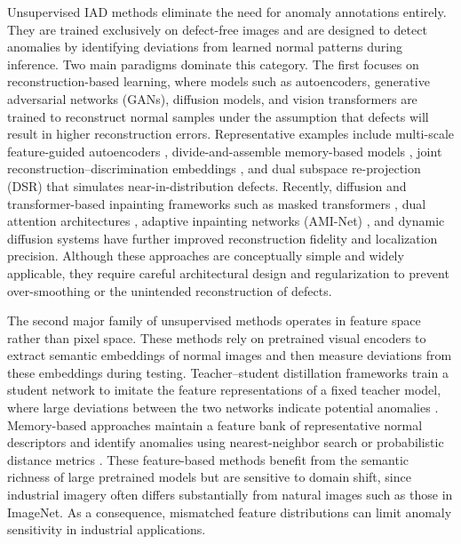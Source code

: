 Unsupervised IAD methods eliminate the need for anomaly annotations entirely. They are trained exclusively on defect-free images and are designed to detect anomalies by identifying deviations from learned normal patterns during inference. Two main paradigms dominate this category. The first focuses on reconstruction-based learning, where models such as autoencoders, generative adversarial networks (GANs), diffusion models, and vision transformers are trained to reconstruct normal samples under the assumption that defects will result in higher reconstruction errors. Representative examples include multi-scale feature-guided autoencoders \cite{shi2021dfr}, divide-and-assemble memory-based models \cite{hou2021divide}, joint reconstruction–discrimination embeddings \cite{zavrtanik2021draem}, and dual subspace re-projection (DSR) \cite{zavrtanik2022dsr} that simulates near-in-distribution defects. Recently, diffusion and transformer-based inpainting frameworks such as masked transformers \cite{de2022masked}, dual attention architectures \cite{yao2023focus}, adaptive inpainting networks (AMI-Net) \cite{luo2024ami}, and dynamic diffusion systems \cite{zhang2023unsupervised, lu2023removing, tebbe2024dynamic} have further improved reconstruction fidelity and localization precision. Although these approaches are conceptually simple and widely applicable, they require careful architectural design and regularization to prevent over-smoothing or the unintended reconstruction of defects.

The second major family of unsupervised methods operates in feature space rather than pixel space. These methods rely on pretrained visual encoders to extract semantic embeddings of normal images and then measure deviations from these embeddings during testing. Teacher–student distillation frameworks train a student network to imitate the feature representations of a fixed teacher model, where large deviations between the two networks indicate potential anomalies \cite{bergmann2020uninformed, salehi2021multiresolution, wan2022unsupervised, gu2023remembering, tong2024enhanced}. Memory-based approaches maintain a feature bank of representative normal descriptors and identify anomalies using nearest-neighbor search or probabilistic distance metrics \cite{defard2021padim, roth2022towards, bae2023pni, zuo2024reconstruction, hyun2024reconpatch}. These feature-based methods benefit from the semantic richness of large pretrained models but are sensitive to domain shift, since industrial imagery often differs substantially from natural images such as those in ImageNet. As a consequence, mismatched feature distributions can limit anomaly sensitivity in industrial applications.

